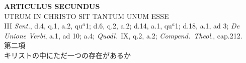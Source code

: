 \documentclass[paper=a4paper,fontsize=10pt,jafontsize=9pt,titlepage]{jlreq}
\begin{document}
\newpage
{}
{}
\setcounter{section}{2}
\setcounter{subsection}{0}



\begin{center}
 {\Large {\bfseries ARTICULUS SECUNDUS}}\\
 {\large UTRUM IN CHRISTO SIT TANTUM UNUM ESSE}\\
 {\footnotesize III {\itshape Sent.}, d.4, q.1, a.2, qu$^a$1; d.6, q.2, a.2;
 d.14, a.1, qu$^a$1; d.18, a.1, ad 3; {\itshape De Unione Verbi}, a.1,
 ad 10; a.4; {\itshape Quodl}.~IX, q.2, a.2; {\itshape Compend.~Theol.},
 cap.212.}\\
 {\Large 第二項\\キリストの中にただ一つの存在があるか}
\end{center}
\end{document}
